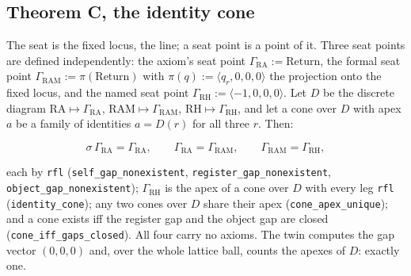 \documentclass[10pt,twocolumn]{article}
\begin{document}
\hypertarget{theorem-c-the-identity-cone}{%
\subsection{Theorem C, the identity
cone}\label{theorem-c-the-identity-cone}}

The seat is the fixed locus, the line; a seat point is a point of it.
Three seat points are defined independently: the axiom's seat point
\(\Gamma_{\mathrm{RA}} := \mathrm{Return}\), the formal seat point
\(\Gamma_{\mathrm{RAM}} := \pi(\mathrm{Return})\) with
\(\pi(q) := \langle q_r, 0, 0, 0 \rangle\) the projection onto the fixed
locus, and the named seat point
\(\Gamma_{\mathrm{RH}} := \langle -1, 0, 0, 0 \rangle\). Let \(D\) be
the discrete diagram \(\mathrm{RA} \mapsto \Gamma_{\mathrm{RA}}\),
\(\mathrm{RAM} \mapsto \Gamma_{\mathrm{RAM}}\),
\(\mathrm{RH} \mapsto \Gamma_{\mathrm{RH}}\), and let a cone over \(D\)
with apex \(a\) be a family of identities \(a = D(r)\) for all three
\(r\). Then:

\[\sigma\,\Gamma_{\mathrm{RA}} = \Gamma_{\mathrm{RA}}, \qquad \Gamma_{\mathrm{RA}} = \Gamma_{\mathrm{RAM}}, \qquad \Gamma_{\mathrm{RAM}} = \Gamma_{\mathrm{RH}},\]

each by \texttt{rfl}
(\texttt{self\_\allowbreak gap\_\allowbreak nonexistent},
\texttt{register\_\allowbreak gap\_\allowbreak nonexistent},
\texttt{object\_\allowbreak gap\_\allowbreak nonexistent});
\(\Gamma_{\mathrm{RH}}\) is the apex of a cone over \(D\) with every leg
\texttt{rfl} (\texttt{identity\_\allowbreak cone}); any two cones over
\(D\) share their apex
(\texttt{cone\_\allowbreak apex\_\allowbreak unique}); and a cone exists
iff the register gap and the object gap are closed
(\texttt{cone\_\allowbreak iff\_\allowbreak gaps\_\allowbreak closed}).
All four carry no axioms. The twin computes the gap vector \((0, 0, 0)\)
and, over the whole lattice ball, counts the apexes of \(D\): exactly
one.
\end{document}
